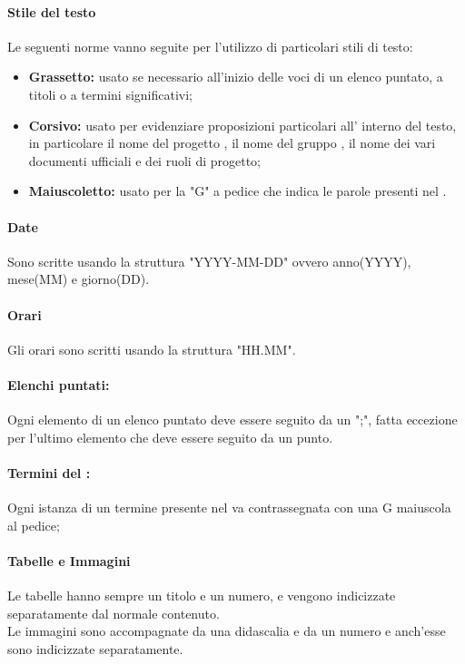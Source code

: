       \paragraph{Stile del testo}
      Le seguenti norme vanno seguite per l'utilizzo di particolari stili di testo:
      \begin{itemize}
        \item \textbf{Grassetto:} usato se necessario all'inizio delle voci di un elenco puntato, a titoli o a termini significativi;
        \item \textbf{Corsivo:} usato per evidenziare proposizioni particolari all' interno del testo, in particolare il nome del progetto \textit{\NomeProgetto}, il nome del gruppo \textit{\Gruppo{}}, il nome dei vari documenti ufficiali e dei ruoli di progetto;
        \item \textbf{Maiuscoletto:} usato per la "G" a pedice che indica le parole presenti nel \Glossario{}.
      \end{itemize}

      \paragraph{Date}
       Sono scritte usando la struttura "YYYY-MM-DD" ovvero anno(YYYY), mese(MM) e giorno(DD).
      \paragraph{Orari}
      Gli orari sono scritti usando la struttura "HH.MM".
      \paragraph{Elenchi puntati:}
      Ogni elemento di un elenco puntato deve essere seguito da un ";", fatta eccezione per l'ultimo elemento che deve essere seguito da un punto.
      \paragraph{Termini del \textit{\Glossario}:}
      Ogni istanza di un termine presente nel \Glossario va contrassegnata con una G maiuscola al pedice;
      \paragraph{Tabelle e Immagini}
      Le tabelle hanno sempre un titolo e un numero, e vengono indicizzate separatamente dal normale contenuto.\\
      Le immagini sono accompagnate da una didascalia e da un numero e anch'esse sono indicizzate separatamente.

